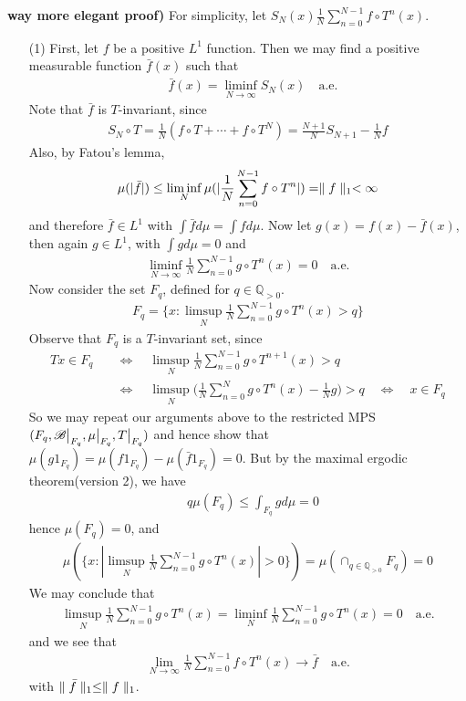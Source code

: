 \documentclass[10pt,a4paper]{report}
\newenvironment{proof}
{\begin{changemargin}{1cm}{0.5cm} 
	}%
	{\end{changemargin}
}
\begin{document}
\begin{proof}
\textbf{way more elegant proof) }
For simplicity, let $S_N(x) \frac{1}{N} \sum_{n=0}^{N-1} f\circ T^n (x)$.
\begin{itemize}
\item[(1)] First, let $f$ be a positive $L^1$ function. Then we may find a positive measurable function $\bar{f}(x)$  such that
\begin{align*}
&\bar{f}(x) = \liminf_{N\rightarrow \infty} S_N(x) \quad \text{a.e.}
\end{align*}
Note that $\bar{f}$ is $T$-invariant, since
\begin{align*}
S_N \circ T = \frac{1}{N}(f\circ T + \cdots + f\circ T^N) = \frac{N+1}{N} S_{N+1} - \frac{1}{N} f
\end{align*} 
Also, by Fatou's lemma,
\begin{align*}
\mu (| \bar{f} |) \leq \liminf_{N} \mu(| \frac{1}{N} \sum_{n=0}^{N-1} f\circ T^n |) = \parallel f \parallel_{1} <\infty  
\end{align*}
and therefore $\bar{f} \in L^1$ with $\int \bar{f} d\mu = \int fd\mu$. Now let $g(x) = f(x) - \bar{f}(x)$, then again $g\in L^1$, with $\int g d\mu = 0$ and 
\begin{align*}
\liminf_{N\rightarrow \infty} \frac{1}{N} \sum_{n=0}^{N-1} g\circ T^n (x) =0 \quad \text{a.e.}
\end{align*}
Now consider the set $F_q$, defined for $q\in \mathbb{Q}_{>0}$.
\begin{align*}
F_q = \{  x: \limsup_N  \frac{1}{N} \sum_{n=0}^{N-1} g \circ T^n (x) > q   \}
\end{align*}
Observe that $F_q$ is a $T$-invariant set, since
\begin{align*}
Tx \in F_q \quad &\Leftrightarrow \quad \limsup_{N} \frac{1}{N} \sum_{n=0}^{N-1} g\circ T^{n+1}(x) > q \\
&\Leftrightarrow \quad \limsup_{N} \Big( \frac{1}{N} \sum_{n=0}^{N} g\circ T^{n}(x) -\frac{1}{N} g \Big) > q \quad \Leftrightarrow \quad x\in F_q
\end{align*}
So we may repeat our arguments above to the restricted MPS $(F_q, \mathscr{B} \big|_{F_q}, \mu\big|_{F_q}, T\big|_{F_q})$ and hence show that $\mu(g 1_{F_q}) = \mu(f 1_{F_q}) - \mu(\bar{f} 1_{F_q}) =0$. But by the maximal ergodic theorem(version 2), we have
\begin{align*}
& q \mu(F_q) \leq  \int_{F_q} g d\mu =0
\end{align*}
hence $\mu(F_q) =0$, and 
\begin{align*}
\mu(\{ x : |\limsup_N  \frac{1}{N} \sum_{n=0}^{N-1} g \circ T^n (x) |>0  \}) = \mu (\cap_{q\in \mathbb{Q}_{>0}} F_q) = 0
\end{align*}
We may conclude that
\begin{align*}
\limsup_N  \frac{1}{N} \sum_{n=0}^{N-1} g \circ T^n (x) = \liminf_N  \frac{1}{N} \sum_{n=0}^{N-1} g \circ T^n (x)  = 0 \quad \text{a.e.}
\end{align*}
and we see that
\begin{align*}
\lim_{N\rightarrow \infty }\frac{1}{N} \sum_{n=0}^{N-1} f \circ T^n (x) \rightarrow \bar{f} \quad \text{a.e.}
\end{align*}
with $\parallel \bar{f} \parallel_{1} \leq \parallel f \parallel_{1}$.


\end{itemize}
\end{proof}
\end{document}

